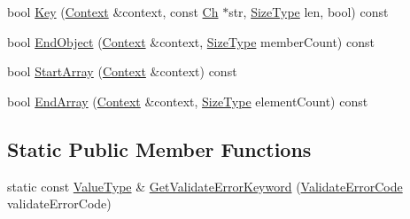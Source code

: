 \begin{DoxyCompactItemize}
\item 
bool \hyperlink{classinternal_1_1Schema_abdd4db48f1b6deb7881777ddc539709a}{Key} (\hyperlink{classinternal_1_1Schema_ac3f54abfefe300c5610c1205869cfd66}{Context} \&context, const \hyperlink{classinternal_1_1Schema_a98043fca39adbf8b42e7472e3d80d6fa}{Ch} $\ast$str, \hyperlink{rapidjson_8h_a5ed6e6e67250fadbd041127e6386dcb5}{Size\+Type} len, bool) const
\item 
bool \hyperlink{classinternal_1_1Schema_a5f74464dae5d41d5cbf626c8d6729d8a}{End\+Object} (\hyperlink{classinternal_1_1Schema_ac3f54abfefe300c5610c1205869cfd66}{Context} \&context, \hyperlink{rapidjson_8h_a5ed6e6e67250fadbd041127e6386dcb5}{Size\+Type} member\+Count) const
\item 
bool \hyperlink{classinternal_1_1Schema_a094fbac3c04493aae304ef3011866f34}{Start\+Array} (\hyperlink{classinternal_1_1Schema_ac3f54abfefe300c5610c1205869cfd66}{Context} \&context) const
\item 
bool \hyperlink{classinternal_1_1Schema_a7cae24caa7c2de31e7c5c07d23c737b3}{End\+Array} (\hyperlink{classinternal_1_1Schema_ac3f54abfefe300c5610c1205869cfd66}{Context} \&context, \hyperlink{rapidjson_8h_a5ed6e6e67250fadbd041127e6386dcb5}{Size\+Type} element\+Count) const
\end{DoxyCompactItemize}
\subsection*{Static Public Member Functions}
\begin{DoxyCompactItemize}
\item 
static const \hyperlink{classinternal_1_1Schema_a8976b6d7e2a885483d0b51d941019340}{Value\+Type} \& \hyperlink{classinternal_1_1Schema_ac2fc7b192866ec6bbb2187194cb23cd2}{Get\+Validate\+Error\+Keyword} (\hyperlink{group__RAPIDJSON__ERRORS_ga2e1f88f94a5d9a6817a5de0ed2f0105a}{Validate\+Error\+Code} validate\+Error\+Code)
\end{DoxyCompactItemize}
